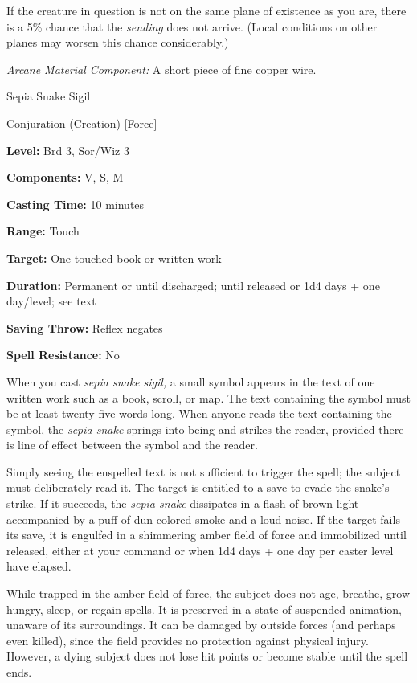 \documentclass{article}
\begin{document}
If the creature in question is not on the same plane of existence as you are, there 
is a 5\% chance that the \textit{sending }does not arrive. (Local conditions on 
other planes may worsen this chance considerably.)

\textit{Arcane Material Component: }A short piece of fine copper wire.

\vspace{12pt}
Sepia Snake Sigil

Conjuration (Creation) [Force]

\textbf{Level:} Brd 3, Sor/Wiz 3

\textbf{Components:} V, S, M

\textbf{Casting Time:} 10 minutes

\textbf{Range:} Touch

\textbf{Target:} One touched book or written work

\textbf{Duration:} Permanent or until discharged; until released or 1d4 days + 
one day/level; see text

\textbf{Saving Throw:} Reflex negates

\textbf{Spell Resistance:} No

When you cast \textit{sepia snake sigil, }a small symbol appears in the text of 
one written work such as a book, scroll, or map. The text containing the symbol 
must be at least twenty-five words long. When anyone reads the text containing 
the symbol, the \textit{sepia snake }springs into being and strikes the reader, 
provided there is line of effect between the symbol and the reader.

Simply seeing the enspelled text is not sufficient to trigger the spell; the subject 
must deliberately read it. The target is entitled to a save to evade the snake's 
strike. If it succeeds, the \textit{sepia snake }dissipates in a flash of brown 
light accompanied by a puff of dun-colored smoke and a loud noise. If the target 
fails its save, it is engulfed in a shimmering amber field of force and immobilized 
until released, either at your command or when 1d4 days + one day per caster level 
have elapsed.

While trapped in the amber field of force, the subject does not age, breathe, grow 
hungry, sleep, or regain spells. It is preserved in a state of suspended animation, 
unaware of its surroundings. It can be damaged by outside forces (and perhaps even 
killed), since the field provides no protection against physical injury. However, 
a dying subject does not lose hit points or become stable until the spell ends.
\end{document}
